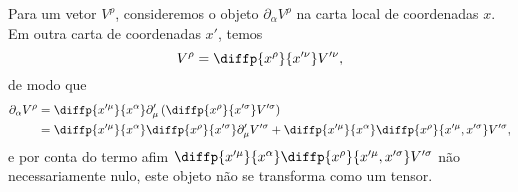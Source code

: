 Para um vetor \(V^\rho\), consideremos o objeto \(\partial_{\alpha}V^\rho\) na carta local de coordenadas \(x\). Em outra carta de coordenadas \(x'\), temos
\begin{equation*}
 V^\rho = \diffp{x^\rho}{x'^\nu} V'^\nu,
\end{equation*}
de modo que
\begin{align*}
    \partial_{\alpha}V^\rho &= \diffp{x'^\mu}{x^\alpha} \partial'_{\mu}\left(\diffp{x^\rho}{x'^\sigma} V'^\sigma\right)\\
                             &= \diffp{x'^\mu}{x^\alpha} \diffp{x^\rho}{x'^\sigma} \partial'_\mu V'^\sigma + \diffp{x'^\mu}{x^\alpha} \diffp{x^\rho}{x'^\mu,x'^\sigma} V'^\sigma,
\end{align*}
e por conta do termo afim \(\diffp{x'^\mu}{x^\alpha} \diffp{x^\rho}{x'^\mu,x'^\sigma} V'^\sigma\) não necessariamente nulo, este objeto não se transforma como um tensor.

